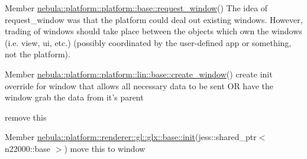 \label{todo__todo000006}
\hypertarget{todo__todo000006}{}
 
\begin{DoxyDescription}
\item[Member \hyperlink{classnebula_1_1platform_1_1platform_1_1base_ad9dd0043c0e52019ed6e24a2d17b686e}{nebula::platform::platform::base::request\_\-window}() ]The idea of request\_\-window was that the platform could deal out existing windows. However, trading of windows should take place between the objects which own the windows (i.e. view, ui, etc.) (possibly coordinated by the user-\/defined app or something, not the platform). 
\end{DoxyDescription}

\label{todo__todo000007}
\hypertarget{todo__todo000007}{}
 
\begin{DoxyDescription}
\item[Member \hyperlink{classnebula_1_1platform_1_1platform_1_1lin_1_1base_a2edb327fb68f9198ec048d9902dddb3b}{nebula::platform::platform::lin::base::create\_\-window}() ]create init override for window that allows all necessary data to be sent OR have the window grab the data from it's parent 

remove this 
\end{DoxyDescription}

\label{todo__todo000009}
\hypertarget{todo__todo000009}{}
 
\begin{DoxyDescription}
\item[Member \hyperlink{classnebula_1_1platform_1_1renderer_1_1gl_1_1glx_1_1base_a08357ff32222b7e316db783de5755a2e}{nebula::platform::renderer::gl::glx::base::init}(jess::shared\_\-ptr$<$ n22000::base $>$) ]move this to window 
\end{DoxyDescription}